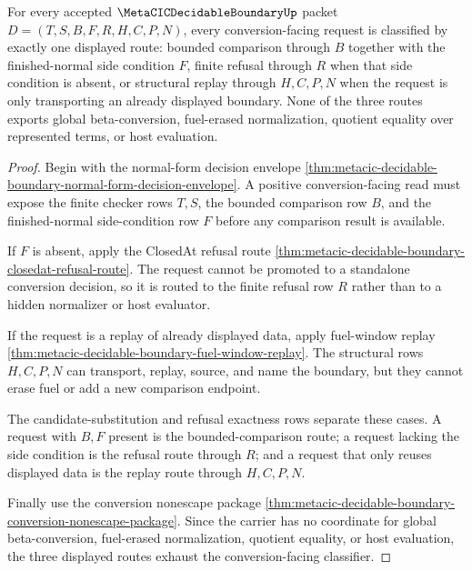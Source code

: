 \begin{theorem}
\label{thm:metacic-decidable-boundary-conversion-refusal-trichotomy}
For every accepted $\MetaCICDecidableBoundaryUp$ packet $D=(T,S,B,F,R,H,C,P,N)$, every conversion-facing request is classified by exactly one displayed route: bounded comparison through $B$ together with the finished-normal side condition $F$, finite refusal through $R$ when that side condition is absent, or structural replay through $H,C,P,N$ when the request is only transporting an already displayed boundary. None of the three routes exports global beta-conversion, fuel-erased normalization, quotient equality over represented terms, or host evaluation.
\end{theorem}
\begin{proof}
Begin with the normal-form decision envelope \autoref{thm:metacic-decidable-boundary-normal-form-decision-envelope}. A positive conversion-facing read must expose the finite checker rows $T,S$, the bounded comparison row $B$, and the finished-normal side-condition row $F$ before any comparison result is available.

If $F$ is absent, apply the ClosedAt refusal route \autoref{thm:metacic-decidable-boundary-closedat-refusal-route}. The request cannot be promoted to a standalone conversion decision, so it is routed to the finite refusal row $R$ rather than to a hidden normalizer or host evaluator.

If the request is a replay of already displayed data, apply fuel-window replay \autoref{thm:metacic-decidable-boundary-fuel-window-replay}. The structural rows $H,C,P,N$ can transport, replay, source, and name the boundary, but they cannot erase fuel or add a new comparison endpoint.

The candidate-substitution and refusal exactness rows separate these cases. A request with $B,F$ present is the bounded-comparison route; a request lacking the side condition is the refusal route through $R$; and a request that only reuses displayed data is the replay route through $H,C,P,N$.

Finally use the conversion nonescape package \autoref{thm:metacic-decidable-boundary-conversion-nonescape-package}. Since the carrier has no coordinate for global beta-conversion, fuel-erased normalization, quotient equality, or host evaluation, the three displayed routes exhaust the conversion-facing classifier.
\end{proof}

